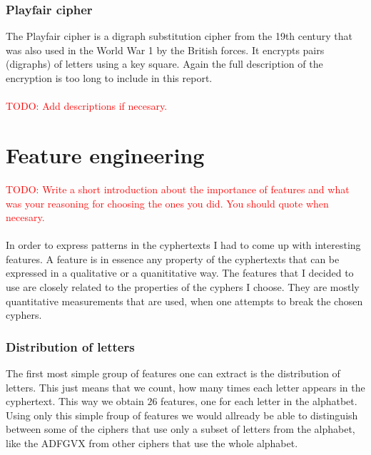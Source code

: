 \documentclass[a4paper]{article}
\begin{document}
\subsubsection*{Playfair cipher}
The Playfair cipher is a digraph substitution cipher from the 19th century that was also used in the World War 1 by the British forces. It encrypts pairs (digraphs) of letters using a key square. Again the full description of the encryption is too long to include in this report.\\
\\
\textcolor{red}{TODO: Add descriptions if necesary.}


\section*{Feature engineering}
\textcolor{red}{TODO: Write a short introduction about the importance of features and what was your reasoning for choosing the ones you did. You should quote when necesary.}\\
\\
In order to express patterns in the cyphertexts I had to come up with interesting features. A feature is in essence any property of the cyphertexts that can be expressed in a qualitative or a quanititative way. The features that I decided to use are closely related to the properties of the cyphers I choose. They are mostly quantitative measurements that are used, when one attempts to break the chosen cyphers.

\subsubsection*{Distribution of letters}
The first most simple group of features one can extract is the distribution of letters. This just means that we count, how many times each letter appears in the cyphertext. This way we obtain $26$ features, one for each letter in the alphatbet. Using only this simple froup of features we would allready be able to distinguish between some of the ciphers that use only a subset of letters from the alphabet, like the ADFGVX from other ciphers that use the whole alphabet.
\end{document}
